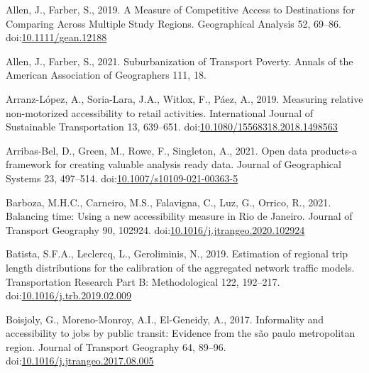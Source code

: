 \documentclass[]{elsarticle} %
\newlength{\cslhangindent}
\newlength{\cslentryspacingunit} %
\newenvironment{CSLReferences}[2] %
 {%
  \setlength{\parindent}{0pt}
  \ifodd #1
  \let\oldpar\par
  \def\par{\hangindent=\cslhangindent\oldpar}
  \fi
  \setlength{\parskip}{#2\cslentryspacingunit}
 }%
 {}
\begin{document}
\hypertarget{refs}{}
\begin{CSLReferences}{1}{0}
\leavevmode{}%
Allen, J., Farber, S., 2019. A Measure of Competitive Access to
Destinations for Comparing Across Multiple Study Regions. Geographical
Analysis 52, 69--86.
doi:\href{https://doi.org/10.1111/gean.12188}{10.1111/gean.12188}

\leavevmode{}%
Allen, J., Farber, S., 2021. Suburbanization of {Transport} {Poverty}.
Annals of the American Association of Geographers 111, 18.

\leavevmode{}%
Arranz-López, A., Soria-Lara, J.A., Witlox, F., Páez, A., 2019.
Measuring relative non-motorized accessibility to retail activities.
International Journal of Sustainable Transportation 13, 639--651.
doi:\href{https://doi.org/10.1080/15568318.2018.1498563}{10.1080/15568318.2018.1498563}

\leavevmode{}%
Arribas-Bel, D., Green, M., Rowe, F., Singleton, A., 2021. Open data
products-a framework for creating valuable analysis ready data. Journal
of Geographical Systems 23, 497--514.
doi:\href{https://doi.org/10.1007/s10109-021-00363-5}{10.1007/s10109-021-00363-5}

\leavevmode{}%
Barboza, M.H.C., Carneiro, M.S., Falavigna, C., Luz, G., Orrico, R.,
2021. Balancing time: {Using} a new accessibility measure in {Rio} de
{Janeiro}. Journal of Transport Geography 90, 102924.
doi:\href{https://doi.org/10.1016/j.jtrangeo.2020.102924}{10.1016/j.jtrangeo.2020.102924}

\leavevmode{}%
Batista, S.F.A., Leclercq, L., Geroliminis, N., 2019. Estimation of
regional trip length distributions for the calibration of the aggregated
network traffic models. Transportation Research Part B: Methodological
122, 192--217.
doi:\href{https://doi.org/10.1016/j.trb.2019.02.009}{10.1016/j.trb.2019.02.009}

\leavevmode{}%
Boisjoly, G., Moreno-Monroy, A.I., El-Geneidy, A., 2017. Informality and
accessibility to jobs by public transit: Evidence from the são paulo
metropolitan region. Journal of Transport Geography 64, 89--96.
doi:\href{https://doi.org/10.1016/j.jtrangeo.2017.08.005}{10.1016/j.jtrangeo.2017.08.005}


\end{CSLReferences}
\end{document}
